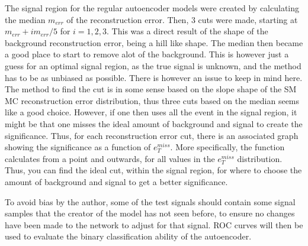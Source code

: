 The signal region for the regular autoencoder models were created by 
calculating the median $m_{err}$ of the reconstruction error. Then, 3 cuts were made, starting at 
$m_{err} + im_{err}/5$ for $i = 1,2,3$. This was a direct result of the shape of the background reconstruction error, being a hill like 
shape. The median then became a good place to start to remove alot of the background. This is however just a guess 
for an optimal signal region, as the true signal is unknown, and the method has to be as unbiased as possible. There is however 
an issue to keep in mind here. The method to find the cut is in some sense based 
on the slope shape of the SM MC reconstruction error distribution, thus three cuts based on the median seems 
like a good choice. However, if one 
then uses all the event in the signal region, it might be that one misses the ideal amount of background and 
signal to create the significance. Thus, 
for each reconstruction error cut, there is an associated graph showing the significance as a function of 
$e_T^{miss}$. More specifically, the function 
calculates from a point and outwards, for all values in the $e_T^{miss}$ distribution. Thus, you can find the ideal cut, 
within the signal region, for where to choose the amount of background and signal to get a better significance.\par 
To avoid bias by the author, 
some of the test signals should contain some signal samples that the creator of the model has not seen before, 
to ensure no changes have been made 
 to the network to adjust for that signal. ROC curves will then be used to evaluate the binary classification 
 ability of the autoencoder. 
 \par 
